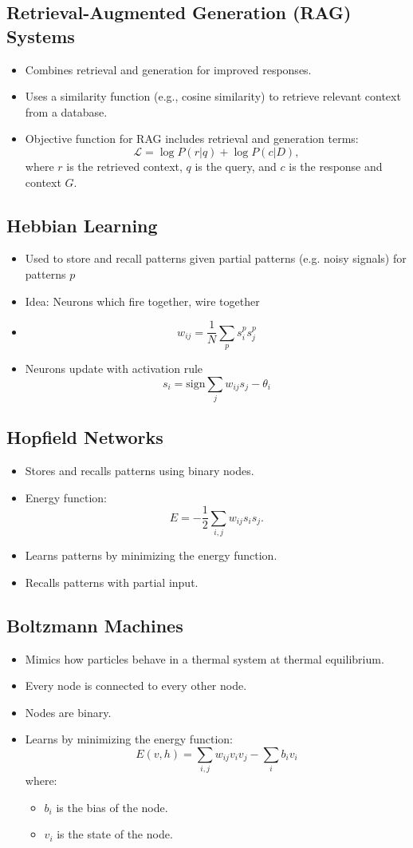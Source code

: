 \documentclass[12pt,a4paper]{article}
\begin{document}
\subsection{Retrieval-Augmented Generation (RAG) Systems}
\begin{itemize}
    \item Combines retrieval and generation for improved responses.
    \item Uses a similarity function (e.g., cosine similarity) to retrieve relevant context from a database.
    \item Objective function for RAG includes retrieval and generation terms:
    \[ \mathcal{L} = \log P(r|q) + \log P(c|D), \]
    where $r$ is the retrieved context, $q$ is the query, and $c$ is the response and context $G$.
\end{itemize}
\subsection{Hebbian Learning}
\begin{itemize}
    \item Used to store and recall patterns given partial patterns (e.g. noisy signals) for patterns $p$
    \item Idea: Neurons which fire together, wire together
    \item \[ w_{ij} = \frac{1}{N} \sum_p s_i^p s_j^p\]
    \item Neurons update with activation rule 
    \[s_i = \text{sign} \sum_j w_{ij} s_j - \theta_i\]
\end{itemize}
\subsection{Hopfield Networks}
\begin{itemize}
    \item Stores and recalls patterns using binary nodes.
    \item Energy function:
    \[ E = -\frac{1}{2} \sum_{i,j} w_{ij}s_i s_j. \]
    \item Learns patterns by minimizing the energy function.
    \item Recalls patterns with partial input.
\end{itemize}
\subsection{Boltzmann Machines}
\begin{itemize}
    \item Mimics how particles behave in a thermal system at thermal equilibrium.
    \item Every node is connected to every other node.
    \item Nodes are binary.
    \item Learns by minimizing the energy function:
    \[
    E(v, h) = \sum_{i,j} w_{ij} v_i v_j - \sum_{i} b_i v_i
    \]
    where:
    \begin{itemize}
        \item \(b_i\) is the bias of the node.
        \item \(v_i\) is the state of the node.
    \end{itemize}
\end{itemize}
\end{document}
